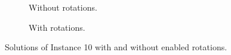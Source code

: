 \documentclass[a4paper, 12pt]{article}
\begin{document}
\begin{figure}
    \centering
    \begin{subfigure}[t]{0.45\textwidth}
        \centering
        \caption{Without rotations.}
    \end{subfigure}
    \hfill
    \begin{subfigure}[t]{0.45\textwidth}
        \centering
        \caption{With rotations.}
    \end{subfigure}
    \caption[Solutions with and without rotations.]{Solutions of Instance 10 with and without enabled rotations.}
    \label{fig:rotations}
\end{figure}
\end{document}
